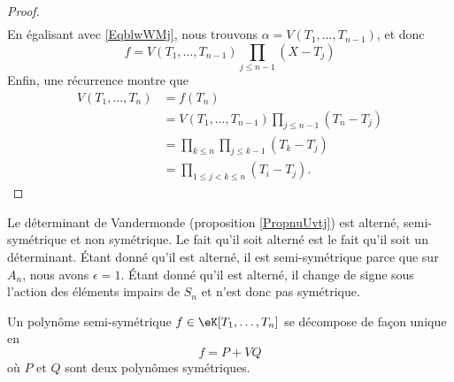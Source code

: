 \begin{proof}
\begin{subequations}
\begin{align}
        \end{align}
    \end{subequations}
    En égalisant avec \eqref{EqblwWMj}, nous trouvons \( \alpha=V(T_1,\ldots, T_{n-1})\), et donc
    \begin{equation}
        f=V(T_1,\ldots, T_{n-1})\prod_{j\leq n-1}(X-T_j)
    \end{equation}
    Enfin, une récurrence montre que
    \begin{subequations}
        \begin{align}
            V(T_1,\ldots, T_n)&=f(T_n)\\
            &=V(T_1,\ldots, T_{n-1})\prod_{j\leq n-1}(T_n-T_j)\\
            &=\prod_{k\leq n}\prod_{j\leq k-1}(T_k-T_j)\\
            &=\prod_{1\leq j<k\leq n}(T_i-T_j).
        \end{align}
    \end{subequations}
\end{proof}

\begin{example}
    Le déterminant de Vandermonde (proposition \ref{PropnuUvtj}) est alterné, semi-symétrique et non symétrique. Le fait qu'il soit alterné est le fait qu'il soit un déterminant. Étant donné qu'il est alterné, il est semi-symétrique parce que sur \( A_n\), nous avons \( \epsilon=1\). Étant donné qu'il est alterné, il change de signe sous l'action des éléments impairs de \( S_n\) et n'est donc pas symétrique.
\end{example}

\begin{proposition} \label{PropUDqXax}
    Un polynôme semi-symétrique \( f\in \eK[T_1,\ldots, T_n]\) se décompose de façon unique en
    \begin{equation}
        f=P+VQ
    \end{equation}
    où \( P\) et \( Q\) sont deux polynômes symétriques.
\end{proposition}

